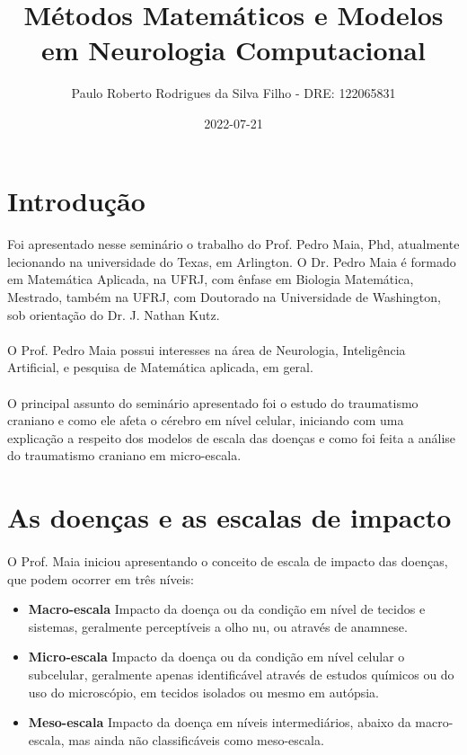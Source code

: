 \documentclass{article}
\title{Métodos Matemáticos e Modelos em Neurologia Computacional}
\date{2022-07-21}
\author{Paulo Roberto Rodrigues da Silva Filho - DRE: 122065831}
\begin{document}
	\renewcommand{\figurename}{Figura}
	\graphicspath{ {./imagens/} }
	\maketitle
	\tableofcontents
	\section{Introdução}
	
	\paragraph{}
	Foi apresentado nesse seminário o trabalho do Prof. Pedro Maia, Phd, atualmente lecionando na universidade do Texas, em Arlington. O Dr. Pedro Maia é formado em Matemática Aplicada, na UFRJ, com ênfase em Biologia Matemática, Mestrado, também na UFRJ, com Doutorado na Universidade de Washington, sob orientação do Dr. J. Nathan Kutz.
	
	\paragraph{}
	O Prof. Pedro Maia possui interesses na área de Neurologia, Inteligência Artificial, e pesquisa de Matemática aplicada, em geral.
	
	\paragraph{}	
	O principal assunto do seminário apresentado foi o estudo do traumatismo craniano e como ele afeta o cérebro em nível celular, iniciando com uma explicação a respeito dos modelos de escala das doenças e como foi feita a análise do traumatismo craniano em micro-escala.
	
	\section{As doenças e as escalas de impacto}
	\paragraph{}
	O Prof. Maia iniciou apresentando o conceito de escala de impacto das doenças, que podem ocorrer em três níveis:
	\begin{itemize}
		\item{\textbf{Macro-escala}} Impacto da doença ou da condição em nível de tecidos e sistemas, geralmente perceptíveis a olho nu, ou através de anamnese.
		\item{\textbf{Micro-escala}} Impacto da doença ou da condição em nível celular o subcelular, geralmente apenas identificável através de estudos químicos ou do uso do microscópio, em tecidos isolados ou mesmo em autópsia.
		\item{\textbf{Meso-escala}} Impacto da doença em níveis intermediários, abaixo da macro-escala, mas ainda não classificáveis como meso-escala. 
	\end{itemize}
	
\end{document}

